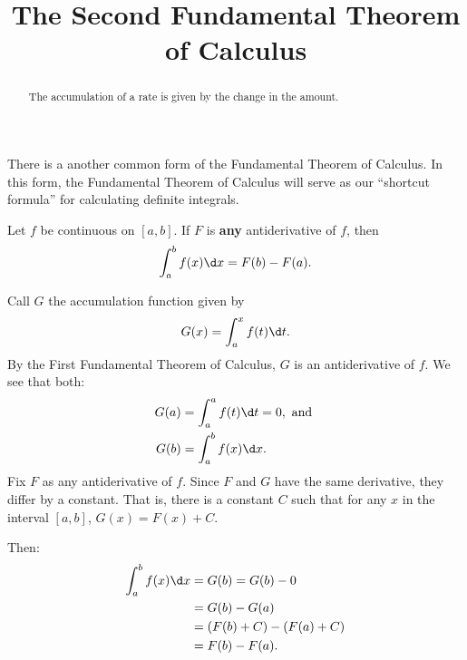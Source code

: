 \documentclass{ximera}
\title[Dig-In:]{The Second Fundamental Theorem of Calculus}
\begin{document}
\begin{abstract}
The accumulation of a rate is given by the change in the amount.
\end{abstract}
\maketitle

There is a another common form of the Fundamental Theorem of Calculus. In this form, the Fundamental Theorem of Calculus will
serve as our ``shortcut formula'' for calculating definite integrals.

\begin{theorem}
	  Let $f$ be continuous on $[a,b]$. If $F$ is \textbf{any}
	  antiderivative of $f$, then
	  \[
	  \int_a^b f(x)\d x = F(b)-F(a).
	  \]
	  \begin{explanation}
	 	Call $G$ the accumulation function given by
	 	\[G(x) = \int_a^x f(t) \d t.\]
	 	By the First Fundamental Theorem of Calculus, $G$ is an antiderivative of $f$. We see that both:
	 	\begin{align*}
	 		G(a) &= \int_a^a f(t) \d t = 0, \textrm{ and } \\
	 		G(b) &= \int_a^b f(x) \d x.
	 	\end{align*}
	 	Fix $F$ as any antiderivative of $f$. Since $F$ and $G$ have the same derivative, they differ by a constant. 
	 	That is, there is a constant $C$ such that for any $x$ in the interval $[a, b]$, $G(x) = F(x)+C$.
	
		Then:
		\begin{align*}
			\int_a^b f(x) \d x &= G(b) = G(b) - 0\\
				&= G(b)-G(a)\\
				&=( F(b)+C ) - ( F(a) + C )\\
				&= F(b) - F(a).
		\end{align*}
	\end{explanation}
\end{theorem}
\end{document}
